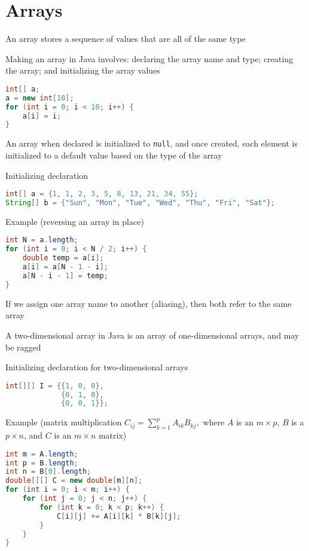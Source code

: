 \documentclass[8pt,a4paper,compress]{beamer}
\begin{document}
\section{Arrays}
\begin{frame}[fragile]
\pause

An array stores a sequence of values that are all of the same type 

\pause
\bigskip

Making an array in Java involves: declaring the array name and type; creating the array; and initializing the array values
\begin{lstlisting}[language=Java]
int[] a;
a = new int[10];
for (int i = 0; i < 10; i++) {
    a[i] = i;
}
\end{lstlisting}

\pause
\bigskip

An array when declared is initialized to \lstinline{null}, and once created, each element is initialized to a default value based on the type of the array

\pause
\bigskip

Initializing declaration
\begin{lstlisting}[language=Java]
int[] a = {1, 1, 2, 3, 5, 8, 13, 21, 34, 55};
String[] b = {"Sun", "Mon", "Tue", "Wed", "Thu", "Fri", "Sat"};
\end{lstlisting}

\pause
\bigskip

Example (reversing an array in place)
\begin{lstlisting}[language=Java]
int N = a.length;
for (int i = 0; i < N / 2; i++) {
    double temp = a[i];
    a[i] = a[N - 1 - i];
    a[N - i - 1] = temp;
}
\end{lstlisting}
\end{frame}

\begin{frame}[fragile]
\pause

If we assign one array name to another (aliasing), then both refer to the same array

\pause
\bigskip

A two-dimensional array in Java is an array of one-dimensional arrays, and may be ragged

\pause
\bigskip

Initializing declaration for two-dimensional arrays
\begin{lstlisting}[language=Java]
int[][] I = {{1, 0, 0}, 
             {0, 1, 0}, 
             {0, 0, 1}};
\end{lstlisting}

\pause
\bigskip

Example (matrix multiplication $C_{ij}=\sum_{k=1}^{p} A_{ik}B_{kj},$ where $A$ is an $m\times p$, $B$ is a $p \times n$, and $C$ is an $m\times n$ matrix)
\begin{lstlisting}[language=Java]
int m = A.length;
int p = B.length;
int n = B[0].length;
double[][] C = new double[m][n];
for (int i = 0; i < m; i++) {
    for (int j = 0; j < n; j++) {
        for (int k = 0; k < p; k++) {
            C[i][j] += A[i][k] * B[k][j];
        }
    }
}
\end{lstlisting}
\end{frame}
\end{document}
